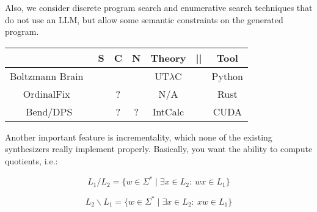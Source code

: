 \documentclass[sigplan,nonacm]{acmart}\settopmatter{printfolios=false,printccs=false,printacmref=false}
\newcommand{\cmark}{\ding{51}}%
\newcommand{\xmark}{\ding{55}}%
\begin{document}
  Also, we consider discrete program search and enumerative search techniques that do not use an LLM, but allow some semantic constraints on the generated program.

  \newcommand{\boltzmann}{\href{https://arxiv.org/pdf/2206.06668}{Boltzmann Brain}~\cite{bendkowski2022automatic}}
  \newcommand{\dps}{\href{https://arxiv.org/pdf/2403.06988}{IntCalc}~\cite{beurer2024guiding}}

   \begin{table}[h]
    \begin{tabular}{c|cccccc}
                                                     & \textbf{S} & \textbf{C} & \textbf{N} & \textbf{Theory} & ||     & \textbf{Tool} \\\hline
      Boltzmann Brain~\cite{bendkowski2022automatic} & \cmark     & \cmark     & \cmark     & UT$\lambda$C    & \cmark & Python        \\
      OrdinalFix~\cite{zhang2023ordinalfix}          & \cmark     & ?          & \xmark     & N/A             & \cmark & Rust          \\
      Bend/DPS                                       & \cmark     & ?          & ?          & IntCalc         & \cmark & CUDA
    \end{tabular}
  \end{table}

  Another important feature is incrementality, which none of the existing synthesizers really implement properly. Basically, you want the ability to compute quotients, i.e.:

  \begin{equation}
    L_{1}/L_{2}=\{w\in \Sigma ^{*}\mid \exists x\in L_{2}\colon \ wx\in L_{1}\}
  \end{equation}

  \begin{equation}
    L_{2}\backslash L_{1}=\{w\in \Sigma ^{*}\mid \exists x\in L_{2}\colon \ xw\in L_{1}\}
  \end{equation}

  \clearpage

  
\end{document}
